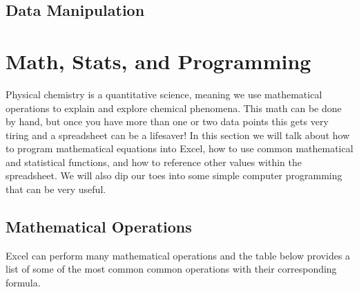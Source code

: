 \documentclass[
]{book}
\begin{document}
\hypertarget{data-manipulation}{%
\section{Data Manipulation}\label{data-manipulation}}

\hypertarget{math-stats-and-programming}{%
\chapter{Math, Stats, and Programming}\label{math-stats-and-programming}}

Physical chemistry is a quantitative science, meaning we use mathematical operations to explain and explore chemical phenomena. This math can be done by hand, but once you have more than one or two data points this gets very tiring and a spreadsheet can be a lifesaver! In this section we will talk about how to program mathematical equations into Excel, how to use common mathematical and statistical functions, and how to reference other values within the spreadsheet. We will also dip our toes into some simple computer programming that can be very useful.

\hypertarget{mathematical-operations}{%
\section{Mathematical Operations}\label{mathematical-operations}}

Excel can perform many mathematical operations and the table below provides a list of some of the most common common operations with their corresponding formula.
\end{document}
